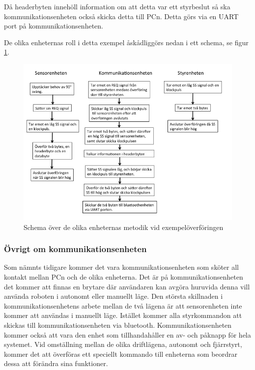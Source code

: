 Då headerbyten innehöll information om att detta var ett styrbeslut så ska kommunikationsenheten också skicka detta till PCn. Detta görs via en UART port på kommunikationsenheten.

De olika enheternas roll i detta exempel åskådliggörs nedan i ett schema, se figur \ref{fig:schema}.


\begin{figure}[H]
 
\includegraphics[angle=0,scale=0.7]{bilder/Schema_exempel.png}
  \caption{Schema över de olika enheternas metodik vid exempelöverföringen}
  \label{fig:schema}
\end{figure}

\subsubsection{Övrigt om kommunikationsenheten}

Som nämnts tidigare kommer det vara kommunikationsenheten som sköter all kontakt mellan PCn och de olika enheterna. Det är på kommunikationsenheten det kommer att finnas en brytare där användaren kan avgöra huruvida denna vill använda roboten i autonomt eller manuellt läge. Den största skillnaden i kommunikationsenhetens arbete mellan de två lägena är att sensorenheten inte kommer att användas i manuellt läge. Istället kommer alla styrkommandon att skickas till kommunikationsenheten via bluetooth. Kommunikationsenheten kommer också att vara den enhet som tillhandahåller en av- och påknapp för hela systemet.
Vid omställning mellan de olika driftlägena, autonomt och fjärrstyrt, kommer det att överföras ett speciellt kommando till enheterna som beordrar dessa att förändra sina funktioner.  

